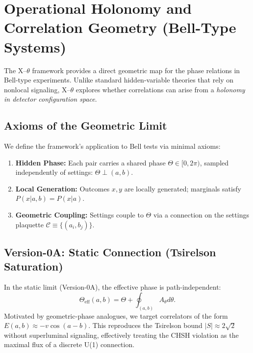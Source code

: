 \section{Operational Holonomy and Correlation Geometry (Bell-Type Systems)}\label{sec:bell}

The X--$\theta$ framework provides a direct geometric map for the phase relations in Bell-type experiments. Unlike standard hidden-variable theories that rely on nonlocal signaling, X--$\theta$ explores whether correlations can arise from a \emph{holonomy in detector configuration space}.

\subsection{Axioms of the Geometric Limit}
We define the framework's application to Bell tests via minimal axioms:
\begin{enumerate}
    \item \textbf{Hidden Phase:} Each pair carries a shared phase $\Theta \in [0,2\pi)$, sampled independently of settings: $\Theta \perp (a,b)$.
    \item \textbf{Local Generation:} Outcomes $x,y$ are locally generated; marginals satisfy $P(x|a,b)=P(x|a)$.
    \item \textbf{Geometric Coupling:} Settings couple to $\Theta$ via a connection on the settings plaquette $\mathcal{C} \equiv \{(a_i,b_j)\}$.
\end{enumerate}

\subsection{Version-0A: Static Connection (Tsirelson Saturation)}
In the static limit (Version-0A), the effective phase is path-independent:
\begin{equation}
\Theta_{\mathrm{eff}}(a,b) = \Theta + \oint_{(a,b)} A_\theta d\theta.
\end{equation}
Motivated by geometric-phase analogues, we target correlators of the form $E(a,b) \approx -v\cos(a-b)$. This reproduces the Tsirelson bound $|S| \approx 2\sqrt{2}$ without superluminal signaling, effectively treating the CHSH violation as the maximal flux of a discrete U(1) connection.

